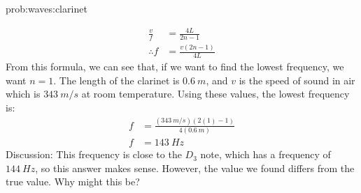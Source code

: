 \begin{solution}{prob:waves:clarinet}
\begin{enumerate}[(a)]
\begin{align*}
\frac{v}{f}&=\frac{4L}{2n-1}\\
\therefore f&=\frac{v(2n-1)}{4L}
\end{align*}
From this formula, we can see that, if we want to find the lowest frequency, we want $n=1$. The length of the clarinet is $\SI{0.6}{m}$, and $v$ is the speed of sound in air which is $\SI{343}{m/s}$ at room temperature. Using these values, the lowest frequency is:
\begin{align*}
f&=\frac{(\SI{343}{m/s})(2(1)-1)}{4(\SI{0.6}{m})}\\
f&=\SI{143}{Hz}
\end{align*}
Discussion: This frequency is close to the $D_3$ note, which has a frequency of $\SI{144}{Hz}$, so this answer makes sense. However, the value we found differs from the true value. Why might this be?
\end{enumerate}
\end{solution}

